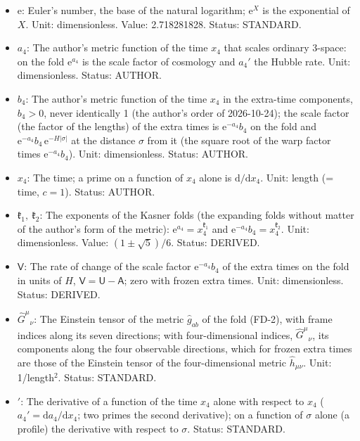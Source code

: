 \documentclass[
  10pt,
]{article}
\providecommand{\tightlist}{%
  \setlength{\itemsep}{0pt}\setlength{\parskip}{0pt}}
\begin{document}
\begin{itemize}
\tightlist
\item
  \(\mathrm{e}\): Euler's number, the base of the natural logarithm;
  \(\mathrm{e}^{X}\) is the exponential of \(X\). Unit: dimensionless.
  Value: 2.718281828. Status: STANDARD.
\item
  \(a_4\): The author's metric function of the time \(x_4\) that scales
  ordinary 3-space: on the fold \(\mathrm{e}^{a_4}\) is the scale factor
  of cosmology and \(a_4'\) the Hubble rate. Unit: dimensionless.
  Status: AUTHOR.
\item
  \(b_4\): The author's metric function of the time \(x_4\) in the
  extra-time components, \(b_4 > 0\), never identically 1 (the author's
  order of 2026-10-24); the scale factor (the factor of the lengths) of
  the extra times is \(\mathrm{e}^{-a_4}b_4\) on the fold and
  \(\mathrm{e}^{-a_4}b_4\,\mathrm{e}^{-H\lvert\sigma\rvert}\) at the
  distance \(\sigma\) from it (the square root of the warp factor times
  \(\mathrm{e}^{-a_4}b_4\)). Unit: dimensionless. Status: AUTHOR.
\item
  \(x_4\): The time; a prime on a function of \(x_4\) alone is
  \(\mathrm{d}/\mathrm{d}x_4\). Unit: length (= time, \(c = 1\)).
  Status: AUTHOR.
\item
  \(\mathfrak{k}_1,\ \mathfrak{k}_2\): The exponents of the Kasner folds
  (the expanding folds without matter of the author's form of the
  metric): \(\mathrm{e}^{a_4} = x_4^{\mathfrak{k}_1}\) and
  \(\mathrm{e}^{-a_4}b_4 = x_4^{\mathfrak{k}_2}\). Unit: dimensionless.
  Value: \((1 \pm \sqrt5)/6\). Status: DERIVED.
\item
  \(\mathsf{V}\): The rate of change of the scale factor
  \(\mathrm{e}^{-a_4}b_4\) of the extra times on the fold in units of
  \(H\), \(\mathsf{V} = \mathsf{U} - \mathsf{A}\); zero with frozen
  extra times. Unit: dimensionless. Status: DERIVED.
\item
  \(\hat G^\mu{}_\nu\): The Einstein tensor of the metric
  \(\hat g_{ab}\) of the fold (FD-2), with frame indices along its seven
  directions; with four-dimensional indices, \(\hat G^\mu{}_\nu\), its
  components along the four observable directions, which for frozen
  extra times are those of the Einstein tensor of the four-dimensional
  metric \(\hat h_{\mu\nu}\). Unit: 1/length\(^2\). Status: STANDARD.
\item
  \({}'\): The derivative of a function of the time \(x_4\) alone with
  respect to \(x_4\) (\(a_4' = \mathrm{d}a_4/\mathrm{d}x_4\); two primes
  the second derivative); on a function of \(\sigma\) alone (a profile)
  the derivative with respect to \(\sigma\). Status: STANDARD.
\end{itemize}
\end{document}
